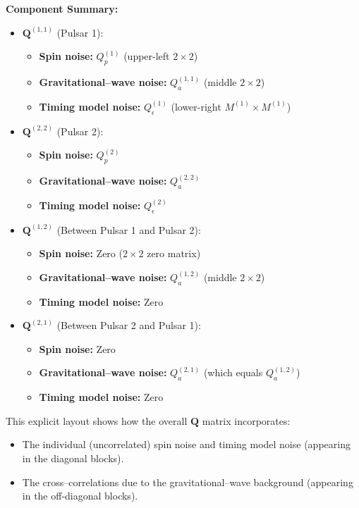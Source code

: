 \documentclass{tufte-handout} %
\begin{document}
	\textbf{Component Summary:}
	\begin{itemize}
		\item \(\boldsymbol{Q}^{(1,1)}\) (Pulsar 1):
		\begin{itemize}
			\item \textbf{Spin noise:} \(Q_p^{(1)}\) (upper-left \(2\times2\))
			\item \textbf{Gravitational--wave noise:} \(Q_a^{(1,1)}\) (middle \(2\times2\))
			\item \textbf{Timing model noise:} \(Q_\epsilon^{(1)}\) (lower-right \(M^{(1)}\times M^{(1)}\))
		\end{itemize}
		\item \(\boldsymbol{Q}^{(2,2)}\) (Pulsar 2):
		\begin{itemize}
			\item \textbf{Spin noise:} \(Q_p^{(2)}\)
			\item \textbf{Gravitational--wave noise:} \(Q_a^{(2,2)}\)
			\item \textbf{Timing model noise:} \(Q_\epsilon^{(2)}\)
		\end{itemize}
		\item \(\boldsymbol{Q}^{(1,2)}\) (Between Pulsar 1 and Pulsar 2):
		\begin{itemize}
			\item \textbf{Spin noise:} Zero (\(2\times2\) zero matrix)
			\item \textbf{Gravitational--wave noise:} \(Q_a^{(1,2)}\) (middle \(2\times2\))
			\item \textbf{Timing model noise:} Zero
		\end{itemize}
		\item \(\boldsymbol{Q}^{(2,1)}\) (Between Pulsar 2 and Pulsar 1):
		\begin{itemize}
			\item \textbf{Spin noise:} Zero
			\item \textbf{Gravitational--wave noise:} \(Q_a^{(2,1)}\) (which equals \(Q_a^{(1,2)}\))
			\item \textbf{Timing model noise:} Zero
		\end{itemize}
	\end{itemize}
	
	This explicit layout shows how the overall \( \boldsymbol{Q} \) matrix incorporates:
	\begin{itemize}
		\item The individual (uncorrelated) spin noise and timing model noise (appearing in the diagonal blocks).
		\item The cross–correlations due to the gravitational--wave background (appearing in the off-diagonal blocks).
	\end{itemize}
	
\end{document}
